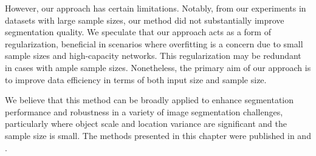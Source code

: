 However, our approach has certain limitations. Notably, from our experiments in datasets with large sample sizes, our method did not substantially improve segmentation quality. We speculate that our approach acts as a form of regularization, beneficial in scenarios where overfitting is a concern due to small sample sizes and high-capacity networks. This regularization may be redundant in cases with ample sample sizes. Nonetheless, the primary aim of our approach is to improve data efficiency in terms of both input size and sample size.

We believe that this method can be broadly applied to enhance segmentation performance and robustness in a variety of image segmentation challenges, particularly where object scale and location variance are significant and the sample size is small. The methods presented in this chapter were published in \cite{bencevicSegmentthenSegmentContextPreservingCropBased2023a} and .


 
